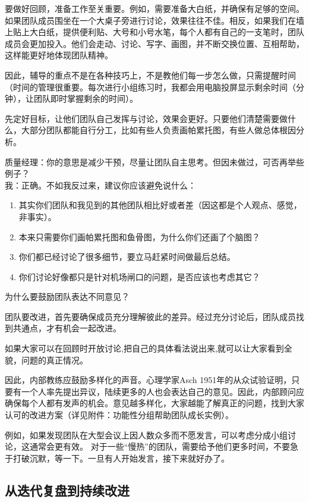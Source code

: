 要做好回顾，准备工作至关重要。例如，需要准备大白纸，并确保有足够的空间。如果团队成员围坐在一个大桌子旁进行讨论，效果往往不佳。相反，如果我们在墙上贴上大白纸，提供便利贴、大号和小号水笔，每个人都有自己的一支笔时，团队成员会更加投入。他们会走动、讨论、写字、画图，并不断交换位置、互相帮助，这样能更好地体现团队精神。

因此，辅导的重点不是在各种技巧上，不是教他们每一步怎么做，只需提醒时间（时间的管理很重要。每次进行小组练习时，我都会用电脑投屏显示剩余时间（分钟），让团队即时掌握剩余的时间）。

先定好目标，让他们团队自己发挥与讨论，效果会更好。只要他们清楚需要做什么，大部分团队都能自行分工，比如有些人负责画帕累托图，有些人做总体根因分析。

质量经理：你的意思是减少干预，尽量让团队自主思考。但因未做过，可否再举些例子？\\
我：正确。不如我反过来，建议你应该避免说什么：

\begin{enumerate}
\tightlist
\item
  其实你们团队和我见到的其他团队相比好或者差（因这都是个人观点、感觉，非事实）。
\item
  本来只需要你们画帕累托图和鱼骨图，为什么你们还画了个脑图？
\item
  你们都已经讨论了很多细节，要立马赶紧时间做最后总结。
\item
  你们讨论好像都只是针对机场闸口的问题，是否应该也考虑其它？
\end{enumerate}

为什么要鼓励团队表达不同意见？

团队要改进，首先要确保成员充分理解彼此的差异。经过充分讨论后，团队成员找到共通点，才有机会一起改进。

如果大家可以在回顾时开放讨论,把自己的具体看法说出来,就可以让大家看到全貌，问题的真正情况。

因此，内部教练应鼓励多样化的声音。心理学家Asch
1951年的从众试验证明，只要有一个人率先提出异议，陆续更多的人也会表达自己的意见。因此，内部顾问应确保每个人都有发声的机会。意见越多样化，大家越能了解真正的问题，找到大家认可的改进方案（详见附件：功能性分组帮助团队成长实例）。

例如，如果发现团队在大型会议上因人数众多而不愿发言，可以考虑分成小组讨论，这通常会更有效。
对于一些``慢热''的团队，需要给予他们更多时间，不要急于打破沉默，等一下。一旦有人开始发言，接下来就好办了。

\hypertarget{ux4eceux8fedux4ee3ux590dux76d8ux5230ux6301ux7eedux6539ux8fdb}{%
\subsection{从迭代复盘到持续改进}\label{ux4eceux8fedux4ee3ux590dux76d8ux5230ux6301ux7eedux6539ux8fdb}}

